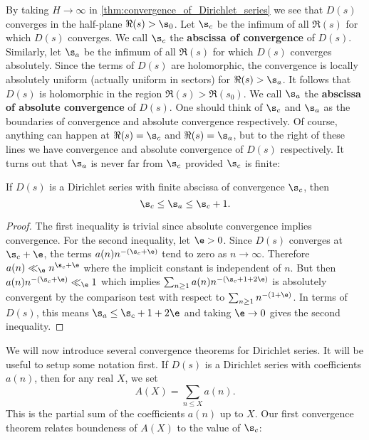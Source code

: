       By taking $H \to \infty$ in \cref{thm:convergence_of_Dirichlet_series} we see that $D(s)$ converges in the half-plane $\Re(s) > \s_{0}$. Let $\s_{c}$ be the infimum of all $\Re(s)$ for which $D(s)$ converges. We call $\s_{c}$ the \textbf{abscissa of convergence} of $D(s)$. Similarly, let $\s_{a}$ be the infimum of all $\Re(s)$ for which $D(s)$ converges absolutely. Since the terms of $D(s)$ are holomorphic, the convergence is locally absolutely uniform (actually uniform in sectors) for $\Re(s) > \s_{a}$. It follows that $D(s)$ is holomorphic in the region $\Re(s) > \Re(s_{0})$.  We call $\s_{a}$ the \textbf{abscissa of absolute convergence} of $D(s)$. One should think of $\s_{c}$ and $\s_{a}$ as the boundaries of convergence and absolute convergence respectively. Of course, anything can happen at $\Re(s) = \s_{c}$ and $\Re(s) = \s_{a}$, but to the right of these lines we have convergence and absolute convergence of $D(s)$ respectively. It turns out that $\s_{a}$ is never far from $\s_{c}$ provided $\s_{c}$ is finite:

      \begin{theorem}
        If $D(s)$ is a Dirichlet series with finite abscissa of convergence $\s_{c}$, then
        \[
          \s_{c} \le \s_{a} \le \s_{c}+1.
        \]
      \end{theorem}
      \begin{proof}
        The first inequality is trivial since absolute convergence implies convergence. For the second inequality, let $\e > 0$. Since $D(s)$ converges at $\s_{c}+\e$, the terms $a(n)n^{-(\s_{c}+\e)}$ tend to zero as $n \to \infty$. Therefore $a(n) \ll_{\e} n^{\s_{c}+\e}$ where the implicit constant is independent of $n$. But then $a(n)n^{-(\s_{c}+\e)} \ll_{\e} 1$ which implies $\sum_{n \ge 1}a(n)n^{-(\s_{c}+1+2\e)}$ is absolutely convergent by the comparison test with respect to $\sum_{n \ge 1}n^{-(1+\e)}$. In terms of $D(s)$, this means $\s_{a} \le \s_{c}+1+2\e$ and taking $\e \to 0$ gives the second inequality.
      \end{proof}

      We will now introduce several convergence theorems for Dirichlet series. It will be useful to setup some notation first. If $D(s)$ is a Dirichlet series with coefficients $a(n)$, then for any real $X$, we set
      \[
        A(X) = \sum_{n \le X}a(n).
      \]
      This is the partial sum of the coefficients $a(n)$ up to $X$. Our first convergence theorem relates boundeness of $A(X)$ to the value of $\s_{c}$: 
      
